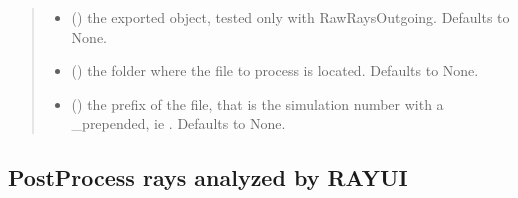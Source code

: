 \documentclass[letterpaper,10pt,english]{sphinxmanual}
\begin{document}
\begin{fulllineitems}
\begin{fulllineitems}
\begin{quote}
\begin{description}
\begin{itemize}
\item {} 
\sphinxAtStartPar
{} (\sphinxstyleliteralemphasis{\sphinxupquote{, }}) \textendash{} the exported object, tested only with RawRaysOutgoing. Defaults to None.

\item {} 
\sphinxAtStartPar
{} (\sphinxstyleliteralemphasis{\sphinxupquote{, }}) \textendash{} the folder where the file to process is located. Defaults to None.

\item {} 
\sphinxAtStartPar
{} (\sphinxstyleliteralemphasis{\sphinxupquote{, }}) \textendash{} the prefix of the file, that is the simulation number with a \_prepended, ie . Defaults to None.

\end{itemize}

\end{description}\end{quote}

\end{fulllineitems}


\end{fulllineitems}



\subsection{PostProcess rays analyzed by RAY\sphinxhyphen{}UI}
\label{\detokenize{code_documentation:postprocess-rays-analyzed-by-ray-ui}}
\end{document}
